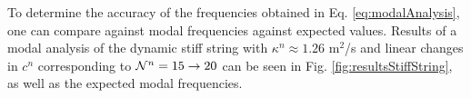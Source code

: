 \documentclass[fleqn]{jaes}
\def\SWcomment[#1]{\textcolor{blue}{#1}}
\begin{document}
To determine the accuracy of the frequencies obtained in Eq. \eqref{eq:modalAnalysis}, one can compare against modal frequencies against expected values.
%
Results of a modal analysis of the dynamic stiff string with $\kappa^n \approx 1.26$ m$^2$/s and linear changes in $c^n$ corresponding to $\mathcal{N}^n = 15 \rightarrow 20$ can be seen in Fig. \ref{fig:resultsStiffString}, as well as the expected modal frequencies. 
%
%
\end{document}
